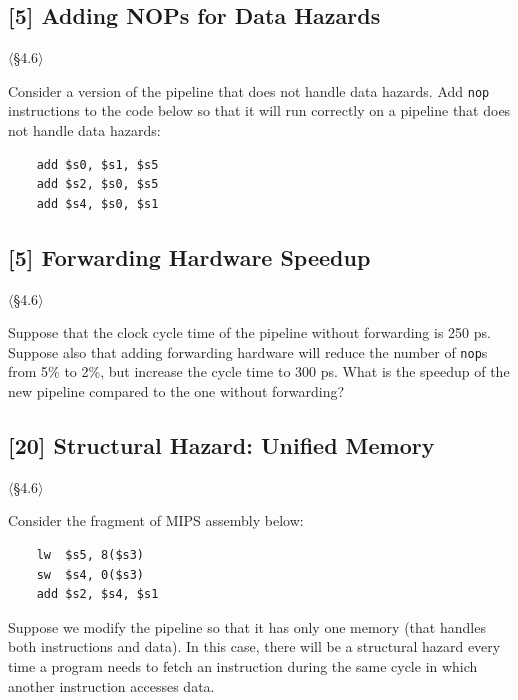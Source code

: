 \problembreak

\subsection{[5] Adding NOPs for Data Hazards}
\hypertarget{prob-4.20}{}
\noindent$\langle$\S4.6$\rangle$\medskip

\noindent Consider a version of the pipeline that does not handle data
hazards. Add \texttt{nop} instructions to the code below so that it will run
correctly on a pipeline that does not handle data hazards:
\begin{verbatim}
    add $s0, $s1, $s5
    add $s2, $s0, $s5
    add $s4, $s0, $s1
\end{verbatim}

\problembreak

\subsection{[5] Forwarding Hardware Speedup}
\hypertarget{prob-4.21}{}
\noindent$\langle$\S4.6$\rangle$\medskip

\noindent Suppose that the clock cycle time of the pipeline without
forwarding is 250 ps. Suppose also that adding forwarding hardware will
reduce the number of \texttt{nop}s from 5\% to 2\%, but increase the cycle
time to 300 ps. What is the speedup of the new pipeline compared to the one
without forwarding?

\problembreak

\subsection{[20] Structural Hazard: Unified Memory}
\hypertarget{prob-4.22}{}
\noindent$\langle$\S4.6$\rangle$\medskip

\noindent Consider the fragment of MIPS assembly below:
\begin{verbatim}
    lw  $s5, 8($s3)
    sw  $s4, 0($s3)
    add $s2, $s4, $s1
\end{verbatim}

\noindent Suppose we modify the pipeline so that it has only one memory (that
handles both instructions and data). In this case, there will be a structural
hazard every time a program needs to fetch an instruction during the same
cycle in which another instruction accesses data.

